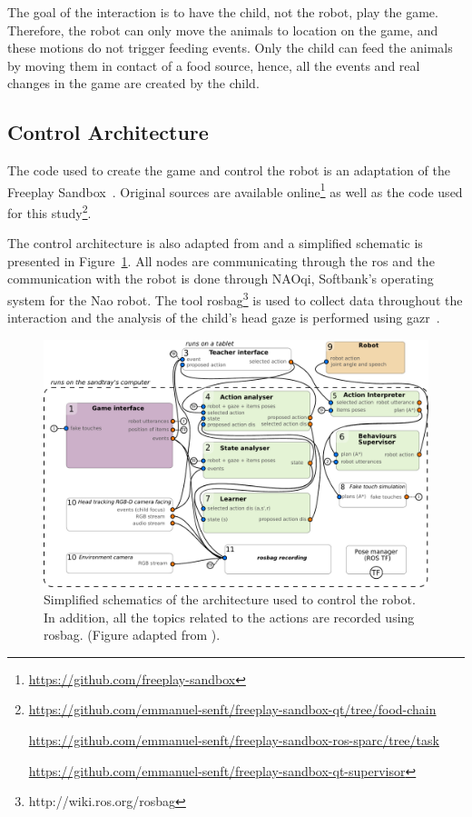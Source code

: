 The goal of the interaction is to have the child, not the robot, play the game. Therefore, the robot can only move the animals to location on the game, and these motions do not trigger feeding events. Only the child can feed the animals by moving them in contact of a food source, hence, all the events and real changes in the game are created by the child. 
\subsection{Control Architecture}\label{sec:tuto_arch}

The code used to create the game and control the robot is an adaptation of the Freeplay Sandbox~\citep{lemaignan2017free}. Original sources are available online\footnote{\url{https://github.com/freeplay-sandbox}} as well as the code used for this study\footnote{\url{https://github.com/emmanuel-senft/freeplay-sandbox-qt/tree/food-chain}
	
\url{https://github.com/emmanuel-senft/freeplay-sandbox-ros-sparc/tree/task}
	
\url{https://github.com/emmanuel-senft/freeplay-sandbox-qt-supervisor}}.

The control architecture is also adapted from \cite{lemaignan2017free} and a simplified schematic is presented in Figure~\ref{fig:tutoring_arch}. All nodes are communicating through the \gls{ros} \citep{quigley2009ros} and the communication with the robot is done through NAOqi, Softbank's operating system for the Nao robot. The tool rosbag\footnote{http://wiki.ros.org/rosbag} is used to collect data throughout the interaction and the analysis of the child's head gaze is performed using gazr~\citep{lemaignan2016real}.

\begin{figure}[ht]
	\centering
	\includegraphics[width=1\textwidth]{architecture.pdf}
	\caption{Simplified schematics of the architecture used to control the robot. In addition, all the topics related to the actions are recorded using rosbag. (Figure adapted from \citealt{lemaignan2017free}).}
	\label{fig:tutoring_arch}
\end{figure}

